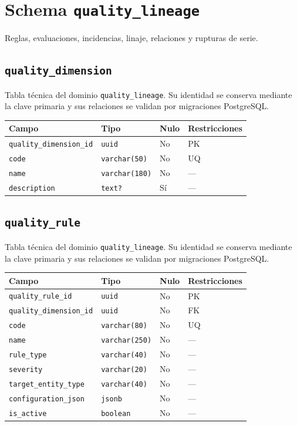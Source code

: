\documentclass[11pt]{article}
\begin{document}
\section{Schema \texttt{quality\_lineage}}
Reglas, evaluaciones, incidencias, linaje, relaciones y rupturas de serie.
\subsection{\texttt{quality\_dimension}}
Tabla técnica del dominio \texttt{quality\_lineage}. Su identidad se conserva mediante la clave primaria y sus relaciones se validan por migraciones PostgreSQL.
\begin{longtable}{>{\raggedright\arraybackslash}p{} p{} p{} p{}}
\toprule Campo & Tipo & Nulo & Restricciones \\ \midrule\endhead
\texttt{quality\_dimension\_id} & \texttt{uuid} & No & PK \\
\texttt{code} & \texttt{varchar(50)} & No & UQ \\
\texttt{name} & \texttt{varchar(180)} & No & --- \\
\texttt{description} & \texttt{text?} & Sí & --- \\
\bottomrule\end{longtable}
\subsection{\texttt{quality\_rule}}
Tabla técnica del dominio \texttt{quality\_lineage}. Su identidad se conserva mediante la clave primaria y sus relaciones se validan por migraciones PostgreSQL.
\begin{longtable}{>{\raggedright\arraybackslash}p{} p{} p{} p{}}
\toprule Campo & Tipo & Nulo & Restricciones \\ \midrule\endhead
\texttt{quality\_rule\_id} & \texttt{uuid} & No & PK \\
\texttt{quality\_dimension\_id} & \texttt{uuid} & No & FK \\
\texttt{code} & \texttt{varchar(80)} & No & UQ \\
\texttt{name} & \texttt{varchar(250)} & No & --- \\
\texttt{rule\_type} & \texttt{varchar(40)} & No & --- \\
\texttt{severity} & \texttt{varchar(20)} & No & --- \\
\texttt{target\_entity\_type} & \texttt{varchar(40)} & No & --- \\
\texttt{configuration\_json} & \texttt{jsonb} & No & --- \\
\texttt{is\_active} & \texttt{boolean} & No & --- \\
\bottomrule\end{longtable}
\end{document}
